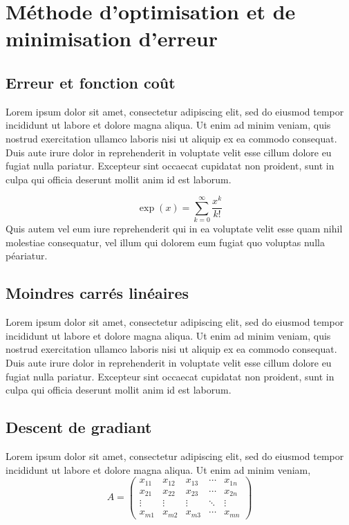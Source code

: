 		
		
	\section{Méthode d'optimisation et de minimisation d'erreur}
	\subsection{Erreur et fonction coût}
		Lorem ipsum dolor sit amet, consectetur adipiscing elit, sed do eiusmod tempor incididunt ut labore et dolore magna aliqua. Ut enim ad minim veniam, quis nostrud exercitation ullamco laboris nisi ut aliquip ex ea commodo consequat. Duis aute irure dolor in reprehenderit in voluptate velit esse cillum dolore eu fugiat nulla pariatur. Excepteur sint occaecat cupidatat non proident, sunt in culpa qui officia deserunt mollit anim id est laborum.
			
		\[\exp(x)=\sum_{k=0}^{\infty}\frac{x^k}{k!}\]
		Quis autem vel eum iure reprehenderit qui in ea voluptate velit esse quam nihil molestiae consequatur, vel illum qui dolorem eum fugiat quo voluptas nulla péariatur.
			
	\subsection{Moindres carrés linéaires}
		Lorem ipsum dolor sit amet, consectetur adipiscing elit, sed do eiusmod tempor incididunt ut labore et dolore magna aliqua. Ut enim ad minim veniam, quis nostrud exercitation ullamco laboris nisi ut aliquip ex ea commodo consequat. Duis aute irure dolor in reprehenderit in voluptate velit esse cillum dolore eu fugiat nulla pariatur. Excepteur sint occaecat cupidatat non proident, sunt in culpa qui officia deserunt mollit anim id est laborum. %
		
			
		
	\subsection{Descent de gradiant}
		Lorem ipsum dolor sit amet, consectetur adipiscing elit, sed do eiusmod tempor incididunt ut labore et dolore magna aliqua. Ut enim ad minim veniam, \\ 
			
			$$A = \begin{pmatrix}
				x_{11} & x_{12} & x_{13} & \cdots & x_{1n} \\
				x_{21} & x_{22} & x_{23} & \cdots & x_{2n} \\
				\vdots & \vdots & \vdots & \ddots & \vdots \\
				x_{m1} & x_{m2} & x_{m3} & \cdots & x_{mn} 
			\end{pmatrix}$$
			
